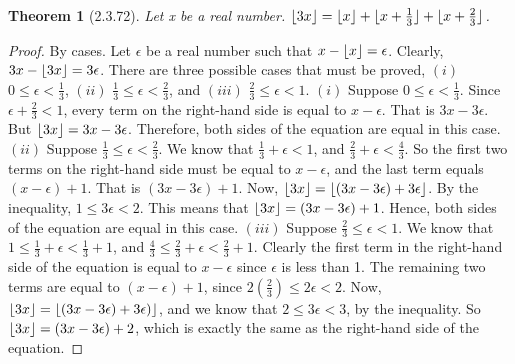 \documentclass[a4paper, 12pt]{article}
\theoremstyle{plain}
\newtheorem*{theorem*}{Theorem}
\DeclarePairedDelimiter{\floor}{\lfloor}{\rfloor}
\begin{document}
	
	\begin{theorem*}[2.3.72]
		Let x be a real number. 
		$\floor{3x} = \floor{x} + \floor{x + \frac{1}{3}} + \floor{x + \frac{2}{3}}$.
	\end{theorem*}
	
	\begin{proof}
		By cases. Let $\epsilon$ be a real number such that $x - \floor{x} = \epsilon$. Clearly, 
		$3x - \floor{3x} = 3\epsilon$. There are three possible cases that must be proved, 
		\newline $(i)$ $0 \le \epsilon < \frac{1}{3}$, $(ii)$ 
		$\frac{1}{3} \le \epsilon < \frac{2}{3}$, and $(iii)$ $\frac{2}{3} \le \epsilon < 1$.
		\newline
		\newline
		$(i)$ Suppose $0 \le \epsilon < \frac{1}{3}$. Since $\epsilon + \frac{2}{3} < 1$, every 
		term on the right-hand side is equal to $x - \epsilon$. That is $3x - 3\epsilon$. But 
		$\floor{3x} = 3x - 3\epsilon$. Therefore, both sides of the equation are equal in this case.
		\newline
		\newline
		$(ii)$ Suppose $\frac{1}{3} \le \epsilon < \frac{2}{3}$. We know that 
		$\frac{1}{3} + \epsilon < 1$, and $\frac{2}{3} + \epsilon < \frac{4}{3}$. So the first two 
		terms on the right-hand side must be equal to $x - \epsilon$, and the last term equals 
		$(x - \epsilon) + 1$. That is $(3x - 3\epsilon) + 1$. Now, 
		$\floor{3x} = \floor{(3x - 3\epsilon) + 3\epsilon}$. By the inequality, 
		$1 \le 3\epsilon < 2$. This means that $\floor{3x} = (3x - 3\epsilon) + 1$. Hence, both 
		sides of the equation are equal in this case.
		\newline
		\newline
		$(iii)$ Suppose $\frac{2}{3} \le \epsilon < 1$. We know that 
		$1 \le \frac{1}{3} + \epsilon < \frac{1}{3} + 1$, and \newline 
		$\frac{4}{3} \le \frac{2}{3} + \epsilon < \frac{2}{3} + 1$. Clearly the first term in the 
		right-hand side of the equation is equal to $x - \epsilon$ since $\epsilon$ is less than 
		1. The remaining two terms are equal to $(x - \epsilon) + 1$, since 
		$2(\frac{2}{3}) \le 2\epsilon < 2$. Now, 
		$\floor{3x} = \floor{(3x - 3\epsilon) + 3\epsilon)}$, and we know that 
		$2 \le 3\epsilon < 3$, by the inequality. So $\floor{3x} = (3x - 3\epsilon) + 2$, which is 
		exactly the same as the right-hand side of the equation.
	\end{proof}
\end{document}
